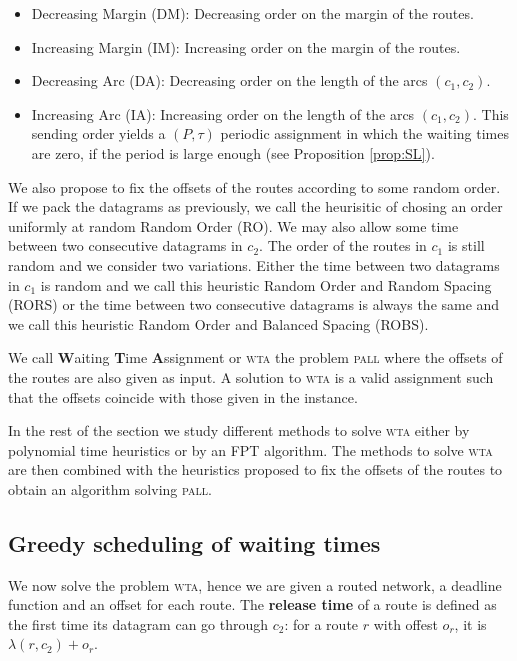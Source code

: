 \documentclass[a4paper,10pt]{article}
\newcommand\pall{\textsc{pall}\xspace}
\newcommand\wta{\textsc{wta}\xspace}
\begin{document}
	\begin{itemize}
	 \item Decreasing Margin (DM): Decreasing order on the margin of the routes.
	 \item Increasing Margin (IM): Increasing order on the margin of the routes. 
	 \item Decreasing Arc (DA): Decreasing order on the length of the arcs $(c_1,c_2)$.
	 \item Increasing Arc (IA): Increasing order on the length of the arcs $(c_1,c_2)$. This sending order yields a $(P,\tau)$ periodic assignment in which the waiting times are zero, if the period is large enough (see Proposition \ref{prop:SL}).
	\end{itemize}

    We also propose to fix the offsets of the routes according to some random order.
    If we pack the datagrams as previously, we call the heurisitic of chosing an order
    uniformly at random Random Order (RO). We may also allow some time between two consecutive datagrams in $c_2$. The order of the routes in $c_1$ is still random and we consider two variations. Either the time between two datagrams in $c_1$ is random and we call this heuristic Random Order and Random Spacing (RORS) or the time between two consecutive datagrams is always the same and we call this heuristic Random Order and Balanced Spacing (ROBS).
 	
 	We call \textbf{W}aiting \textbf{T}ime \textbf{A}ssignment or \wta the problem \pall where the offsets of the routes are also given as input. A solution to \wta
 	is a valid assignment such that the offsets coincide with those given in the instance. 

   In the rest of the section we study different methods to solve \wta either by polynomial time heuristics or by an FPT algorithm. The methods to solve \wta are then combined with the heuristics proposed to fix the offsets of the routes to obtain an algorithm solving \pall.  
   
   \subsection{Greedy scheduling of waiting times}

   We now solve the problem \wta, hence we are given a routed network, a deadline function and an offset for each route. The \textbf{release time} of a route 
   is defined as the first time its datagram can go through $c_2$: for a route $r$ with offest $o_r$, it is $\lambda(r,c_2) + o_r$.
\end{document}
